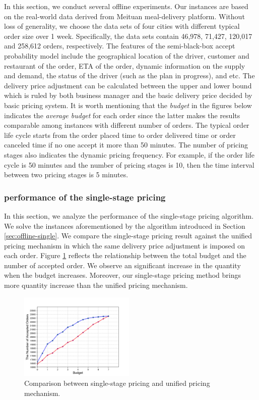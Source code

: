 \documentclass[sigconf,authordraft]{acmart}
\begin{document}
In this section, we conduct several offline experiments. Our instances are based on the real-world data derived from Meituan meal-delivery platform. Without loss of generality, we choose the data sets of four cities with different typical order size over 1 week. Specifically, the data sets contain 46,978, 71,427, 120,017 and 258,612 orders, respectively. The features of the semi-black-box accept probability model include the geographical location of the driver, customer and restaurant of the order, ETA of the order, dynamic information on the supply and demand, the status of the driver (such as the plan in progress), and etc. The delivery price adjustment can be calculated between the upper and lower bound which is ruled by both business manager and the basic delivery price decided by basic pricing system. It is worth mentioning that the \textit{budget} in the figures below indicates the \textit{average budget} for each order since the latter makes the results comparable among instances with different number of orders. The typical order life cycle starts from the order placed time to order delivered time or order canceled time if no one accept it more than 50 minutes. The number of pricing stages also indicates the dynamic pricing frequency. For example, if the order life cycle is 50 minutes and the number of pricing stages is 10, then the time interval between two pricing stages is 5 minutes.

\subsubsection{performance of the single-stage pricing}

In this section, we analyze the performance of the single-stage pricing algorithm. We solve the instances aforementioned by the algorithm introduced in Section \ref{sec:offline-single}. We compare the single-stage pricing result against the unified pricing mechanism in which the same delivery price adjustment is imposed on each order. Figure \ref{fig:s-pricing} reflects the relationship between the total budget and the number of accepted order. We observe an significant increase in the quantity when the budget increases. Moreover, our single-stage pricing method brings more quantity increase than the unified pricing mechanism.

\begin{figure}[h]
  \centering
  \includegraphics[width=0.49\textwidth]{s-pricing-a.png}
  \caption{Comparison between single-stage pricing and unified pricing mechanism.}\label{fig:s-pricing}
\end{figure}
\end{document}
